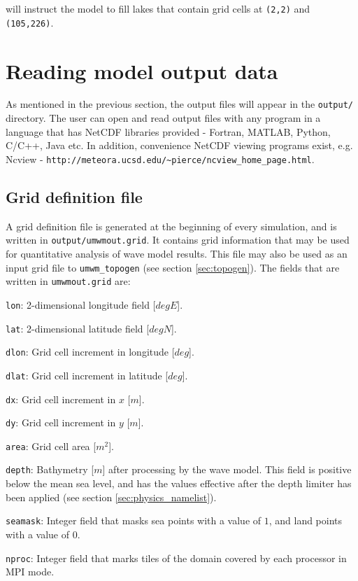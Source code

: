 \documentclass[letterpaper]{article}
\numberwithin{equation}{section}
\begin{document}
will instruct the model to fill lakes that contain 
grid cells at \verb+(2,2)+ and \verb+(105,226)+.

\newpage
\section{Reading model output data}
\label{sec:model_output}

As mentioned in the previous section, the output files will appear in the \verb+output/+ directory.
The user can open and read output files with any program in a language that has NetCDF libraries provided - 
Fortran, MATLAB, Python, C/C++, Java etc. 
In addition, convenience NetCDF viewing programs exist, 
e.g. Ncview - \verb+http://meteora.ucsd.edu/~pierce/ncview_home_page.html+.

\subsection{Grid definition file}

A grid definition file is generated at the beginning of every simulation,
and is written in \verb+output/umwmout.grid+.
It contains grid information that may be used for quantitative analysis
of wave model results. 
This file may also be used as an input grid file to 
\verb+umwm_topogen+ (see section \ref{sec:topogen}). 
The fields that are written in \verb+umwmout.grid+ are:

\verb+lon+:
2-dimensional longitude field [$deg E$].

\verb+lat+:
2-dimensional latitude field [$deg N$].

\verb+dlon+:
Grid cell increment in longitude [$deg$].

\verb+dlat+:
Grid cell increment in latitude [$deg$].

\verb+dx+:
Grid cell increment in $x$ [$m$].

\verb+dy+:
Grid cell increment in $y$ [$m$].

\verb+area+:
Grid cell area [$m^{2}$].

\verb+depth+:
Bathymetry [$m$] after processing by the wave model.
This field is positive below the mean sea level, 
and has the values effective after the depth limiter
has been applied (see section \ref{sec:physics_namelist}).

\verb+seamask+:
Integer field that masks sea points with a value of $1$,
and land points with a value of $0$.

\verb+nproc+:
Integer field that marks tiles of the domain covered by each processor
in MPI mode. 
\end{document}

